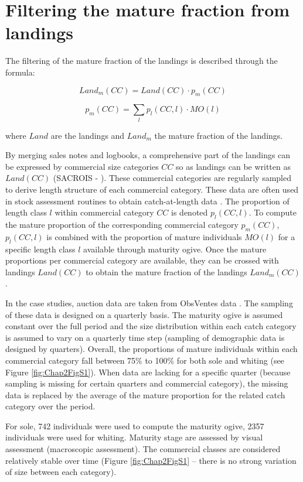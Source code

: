 \section{Filtering the mature fraction from landings}\label{appendix:FilterMature}

The filtering of the mature fraction of the landings is described through the formula: 

$$Land_m(CC) = Land(CC) \cdot p_m(CC)$$

$$p_m(CC) = \sum_l p_l(CC,l) \cdot MO(l)$$

where $Land$ are the landings and $Land_m$ the mature fraction of the landings.

By merging sales notes and logbooks, a comprehensive part of the landings can be expressed by commercial size categories $CC$ so as landings can be written as $Land(CC)$ (SACROIS - \textcite{demaneche-projet-2013}). These commercial categories are regularly sampled to derive length structure of each commercial category. These data are often used in stock assessment routines to obtain catch-at-length data \parencite{ices-report-2017}. The proportion of length class $l$ within commercial category $CC$ is denoted $p_l(CC,l)$. To compute the mature proportion of the corresponding commercial category $p_m(CC)$, $p_l (CC,l)$ is combined with the proportion of mature individuals $MO(l)$ for a specific length class $l$ available through maturity ogive. Once the mature proportions per commercial category are available, they can be crossed with landings $Land(CC)$ to obtain the mature fraction of the landings $Land_m (CC)$.

In the case studies, auction data are taken from ObsVentes data \parencite{vigneau-common-2009}. The sampling of these data is designed on a quarterly basis. The maturity ogive is assumed constant over the full period and the size distribution within each catch category is assumed to vary on a quarterly time step (sampling of demographic data is designed by quarters). Overall, the proportions of mature individuals within each commercial category fall between 75\% to 100\% for both sole and whiting (see Figure \ref{fig:Chap2FigS1}). When data are lacking for a specific quarter (because sampling is missing for certain quarters and commercial category), the missing data is replaced by the average of the mature proportion for the related catch category over the period.

For sole, 742 individuals were used to compute the maturity ogive, 2357 individuals were used for whiting. Maturity stage are assessed by visual assessment (macroscopic assessment). The commercial classes are considered relatively stable over time (Figure \ref{fig:Chap2FigS1} – there is no strong variation of size between each category).


